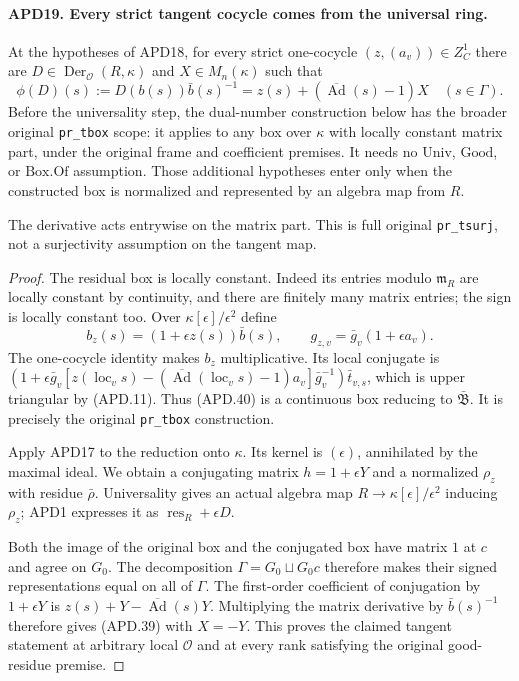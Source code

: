 \documentclass[11pt,a4paper]{article}
\numberwithin{equation}{section}
\theoremstyle{remark}\newtheorem{remark}[theorem]{Remark}
\begin{document}
\paragraph{APD19. Every strict tangent cocycle comes from the universal ring.}
\label{claim:APD19}
At the hypotheses of APD18, for every strict one-cocycle
\((z,(a_v))\in Z_C^1\) there are
\(D\in\operatorname{Der}_{\mathcal O}(R,\kappa)\) and
\(X\in M_n(\kappa)\) such that
\[
 \phi(D)(s):=D(b(s))\bar b(s)^{-1}
              =z(s)+(\overline{\operatorname{Ad}}(s)-1)X
                         \quad(s\in\Gamma).             \tag{APD.39}
\]
Before the universality step, the dual-number construction below
has the broader original \texttt{pr\_\allowbreak tbox} scope: it applies to
any box over \(\kappa\) with locally constant matrix part,
under the original frame and coefficient premises.  It needs no
\(\mathrm{Univ}\), \(\mathrm{Good}\), or
\(\mathrm{Box.Of}\) assumption.  Those additional hypotheses
enter only when the constructed box is normalized and represented
by an algebra map from \(R\).

The derivative acts entrywise on the matrix part.  This is full
original \texttt{pr\_\allowbreak tsurj}, not a surjectivity assumption on
the tangent map.

\begin{proof}
The residual box is locally constant.  Indeed its entries modulo
\(\mathfrak m_R\) are locally constant by continuity, and
there are finitely many matrix entries; the sign is locally
constant too.  Over \(\kappa[\epsilon]/\epsilon^2\) define
\[
 b_z(s)=(1+\epsilon z(s))\bar b(s),
 \qquad g_{z,v}=\bar g_v(1+\epsilon a_v).                  \tag{APD.40}
\]
The one-cocycle identity makes \(b_z\) multiplicative.  Its
local conjugate is
\((1+\epsilon\bar g_v[z(\operatorname{loc}_v s)
 -(\overline{\operatorname{Ad}}(\operatorname{loc}_v s)-1)a_v]
 \bar g_v^{-1})\bar t_{v,s}\), which is upper triangular
by (APD.11).  Thus (APD.40) is a continuous box reducing to
\(\bar{\mathfrak B}\).  It is precisely the original
\texttt{pr\_\allowbreak tbox} construction.

Apply APD17 to the reduction onto \(\kappa\).  Its kernel is
\((\epsilon)\), annihilated by the maximal ideal.  We obtain
a conjugating matrix \(h=1+\epsilon Y\) and a normalized
\(\rho_z\) with residue \(\bar\rho\).  Universality gives
an actual algebra map \(R\to\kappa[\epsilon]/\epsilon^2\)
inducing \(\rho_z\); APD1 expresses it as
\(\operatorname{res}_R+\epsilon D\).

Both the image of the original box and the conjugated box have
matrix \(1\) at \(c\) and agree on \(G_0\).  The decomposition
\(\Gamma=G_0\sqcup G_0c\) therefore makes their signed
representations equal on all of \(\Gamma\).  The first-order
coefficient of conjugation by \(1+\epsilon Y\) is
\(z(s)+Y-\overline{\operatorname{Ad}}(s)Y\).
Multiplying the matrix derivative by \(\bar b(s)^{-1}\)
therefore gives (APD.39) with \(X=-Y\).  This proves the
claimed tangent statement at arbitrary local \(\mathcal O\)
and at every rank satisfying the original good-residue premise.
\end{proof}
\end{document}
